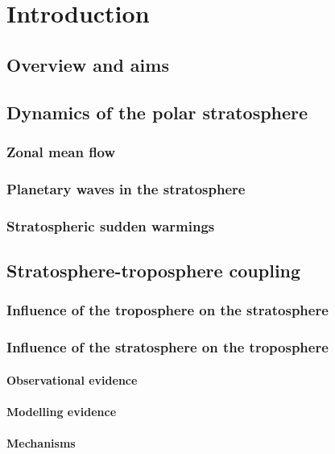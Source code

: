 \chapter{Introduction}
\label{cha:introduction}

\section{Overview and aims}

\section{Dynamics of the polar stratosphere}

\subsection{Zonal mean flow}
\subsection{Planetary waves in the stratosphere}
\label{sec:plan-waves-strat}
\subsection{Stratospheric sudden warmings}


\section{Stratosphere-troposphere coupling}

\subsection{Influence of the troposphere on the stratosphere}
\subsection{Influence of the stratosphere on the troposphere}
\subsubsection{Observational evidence}
\label{sec:observ-evid}
\subsubsection{Modelling evidence}
\subsubsection{Mechanisms}
\label{sec:mechanisms}


